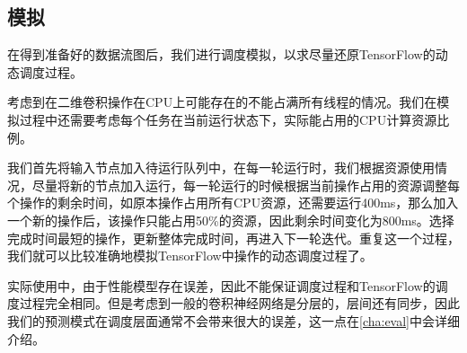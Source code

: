 \subsection{模拟}
    在得到准备好的数据流图后，我们进行调度模拟，以求尽量还原TensorFlow的动态调度过程。

    考虑到在二维卷积操作在CPU上可能存在的不能占满所有线程的情况。我们在模拟过程中还需要考虑每个任务在当前运行状态下，实际能占用的CPU计算资源比例。

    我们首先将输入节点加入待运行队列中，在每一轮运行时，我们根据资源使用情况，尽量将新的节点加入运行，每一轮运行的时候根据当前操作占用的资源调整每个操作的剩余时间，如原本操作占用所有CPU资源，还需要运行400ms，那么加入一个新的操作后，该操作只能占用50\%的资源，因此剩余时间变化为800ms。选择完成时间最短的操作，更新整体完成时间，再进入下一轮迭代。重复这一个过程，我们就可以比较准确地模拟TensorFlow中操作的动态调度过程了。

    实际使用中，由于性能模型存在误差，因此不能保证调度过程和TensorFlow的调度过程完全相同。但是考虑到一般的卷积神经网络是分层的，层间还有同步，因此我们的预测模式在调度层面通常不会带来很大的误差，这一点在\ref{cha:eval}中会详细介绍。
